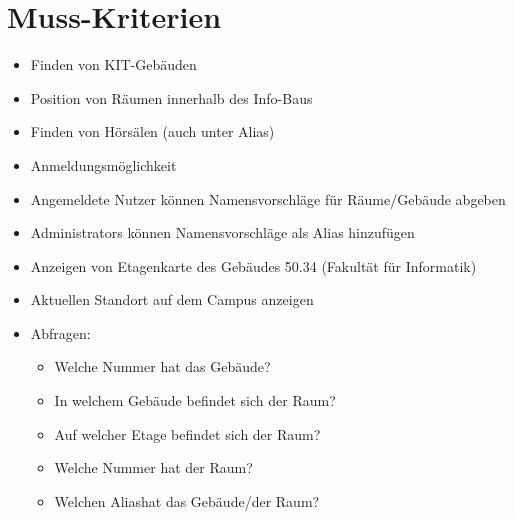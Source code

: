 \section{Muss-Kriterien}

\begin{itemize}

    \item Finden von KIT-Gebäuden
    \item Position von Räumen innerhalb des Info-Baus
    \item Finden von Hörsälen (auch unter Alias)
    \item Anmeldungsmöglichkeit
    \item Angemeldete Nutzer können Namensvorschläge für Räume/Gebäude abgeben
    \item \Glspl{Administrator} können Namensvorschläge als \Gls{Alias} hinzufügen
    \item Anzeigen von \Gls{Etagenkarte} des Gebäudes 50.34 (Fakultät für Informatik)
    \item Aktuellen Standort auf dem \Gls{Campus} anzeigen
    \item Abfragen:
        \begin{itemize}
            \item Welche Nummer hat das Gebäude?
            \item In welchem Gebäude befindet sich der Raum?
            \item Auf welcher Etage befindet sich der Raum?
            \item Welche Nummer hat der Raum?
            \item Welchen \Gls{Alias}hat das Gebäude/der Raum?
        \end{itemize}

\end{itemize}
